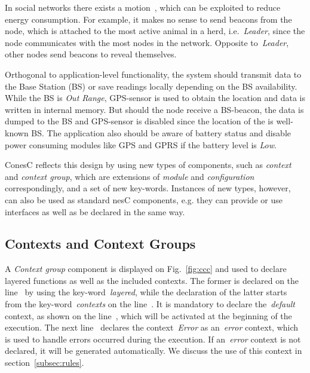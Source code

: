 In social networks there exists a motion~\cite{pasztor10}, which can be exploited to
reduce energy consumption. For example, it makes no sense to send beacons
from the node, which is attached to the most active animal in a herd, i.e.~\emph{Leader},
since the node communicates with the most nodes in the network. Opposite to~\emph{Leader},
other nodes send beacons to reveal themselves.

Orthogonal to application-level functionality, the system should transmit data to
the Base Station (BS) or save readings locally depending on the BS
availability. While the BS is \emph{Out Range}, GPS-sensor is used to
obtain the location and data is written in internal memory. But should the node
receive a BS-beacon, the data is dumped to the BS and GPS-sensor is disabled
since the location of the is well-known BS. The application also should be aware
of battery status and disable power consuming modules like GPS and GPRS if the
battery level is \emph{Low}.

ConesC reflects this design by using new types of components, such as
\emph{context} and \emph{context group}, which are extensions of \emph{module} and
\emph{configuration} correspondingly, and a set of new key-words.
Instances of new types, however, can also be used as standard nesC components,
e.g. they can provide or use interfaces as well as be declared in the same way.


\subsection{Contexts and Context Groups}\label{subsec:components}

A \emph{Context group} component is displayed on Fig.~\ref{fig:ccc} and used to declare layered
functions as well as the included contexts. The former is declared on the line~
by using the key-word~\emph{layered}, while the declaration of the latter starts from the
key-word~\emph{contexts} on the line~. It is mandatory to declare
the~\emph{default} context, as shown on the line~, which will be
activated at the beginning of the execution. The next line~ declares the
context~\emph{Error} as an~\emph{error} context, which is used to handle errors occurred
during the execution. If an~\emph{error} context is not declared, it will be generated automatically.
We discuss the use of this context in section~\ref{subsec:rules}.

